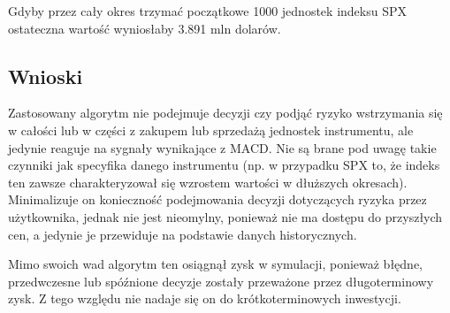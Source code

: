 \documentclass{article}
\begin{document}
Gdyby przez cały okres trzymać początkowe 1000 jednostek indeksu SPX ostateczna wartość wyniosłaby 3.891 mln dolarów.

\subsection{Wnioski}

Zastosowany algorytm nie podejmuje decyzji czy podjąć ryzyko wstrzymania się w całości lub w części z zakupem lub sprzedażą jednostek instrumentu, ale jedynie reaguje na sygnały wynikające z MACD. Nie są brane pod uwagę takie czynniki jak specyfika danego instrumentu (np. w przypadku SPX to, że indeks ten zawsze charakteryzował się wzrostem wartości w dłuższych okresach). Minimalizuje on konieczność podejmowania decyzji dotyczących ryzyka przez użytkownika, jednak nie jest nieomylny, ponieważ nie ma dostępu do przyszłych cen, a jedynie je przewiduje na podstawie danych historycznych.

Mimo swoich wad algorytm ten osiągnął zysk w symulacji, ponieważ błędne, przedwczesne lub spóźnione decyzje zostały przeważone przez długoterminowy zysk. Z tego względu nie nadaje się on do krótkoterminowych inwestycji.



\end{document}
